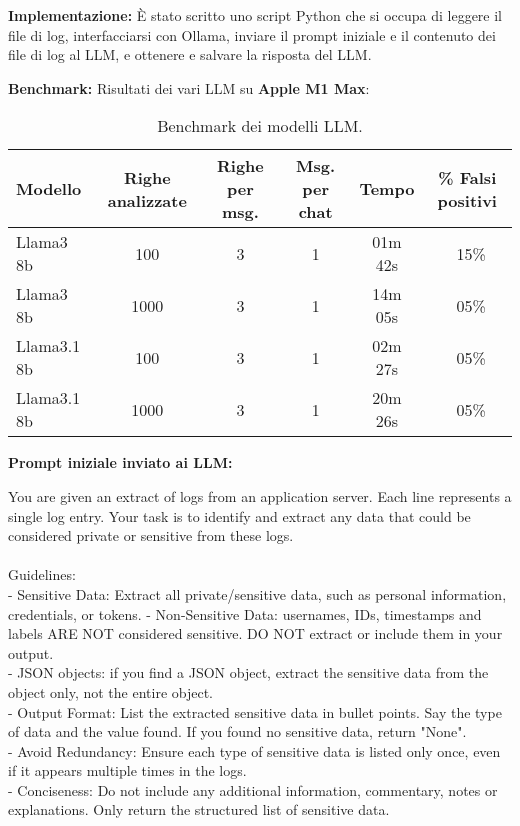 \documentclass[12pt]{report}
\begin{document}
\textbf{Implementazione:}
È stato scritto uno script Python che si occupa di leggere il file di log, interfacciarsi con Ollama, inviare il prompt iniziale e il contenuto dei file di log al LLM, e ottenere e salvare la risposta del LLM.

\textbf{Benchmark:}
Risultati dei vari LLM su \textbf{Apple M1 Max}:

\begin{table}[h!]
    \centering
    \begin{tabular}{|l|c|c|c|c|c|}
        \hline
        \textbf{Modello} & \textbf{Righe analizzate} & \textbf{Righe per msg.} & \textbf{Msg. per chat} & \textbf{Tempo} & \textbf{\% Falsi positivi} \\ \hline
        Llama3 8b        & 100                       & 3                       & 1                      & 01m 42s        & ~15\%                      \\ \hline
        Llama3 8b        & 1000                      & 3                       & 1                      & 14m 05s        & ~05\%                      \\ \hline
        Llama3.1 8b      & 100                       & 3                       & 1                      & 02m 27s        & ~05\%                      \\ \hline
        Llama3.1 8b      & 1000                      & 3                       & 1                      & 20m 26s        & ~05\%                      \\ \hline
    \end{tabular}
    \caption{Benchmark dei modelli LLM.}
\end{table}

\textbf{Prompt iniziale inviato ai LLM:}

\begin{tt}
    You are given an extract of logs from an application server. Each line represents a single log entry. Your task is to identify and extract any data that could be considered private or sensitive from these logs.\\
    \\
    Guidelines:\\
    - Sensitive Data: Extract all private/sensitive data, such as personal information, credentials, or tokens.
    - Non-Sensitive Data: usernames, IDs, timestamps and labels ARE NOT considered sensitive. DO NOT extract or include them in your output.\\
    - JSON objects: if you find a JSON object, extract the sensitive data from the object only, not the entire object.\\
    - Output Format: List the extracted sensitive data in bullet points. Say the type of data and the value found. If you found no sensitive data, return "None".\\
    - Avoid Redundancy: Ensure each type of sensitive data is listed only once, even if it appears multiple times in the logs.\\
    - Conciseness: Do not include any additional information, commentary, notes or explanations. Only return the structured list of sensitive data.\\
\end{tt}
\end{document}
